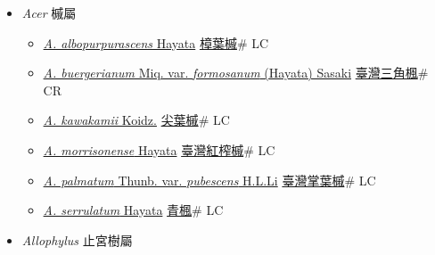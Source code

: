 
  \begin{itemize}
 \item[] \textit{Acer} 槭屬
                    
  \begin{itemize}
        \item[] \href{http://www.theplantlist.org/tpl1.1/search?q=Acer+albopurpurascens}{\textit{A. albopurpurascens} Hayata}   \href{\detokenize{http://taibnet.sinica.edu.tw/chi/taibnet_species_list.php?T2=樟葉槭&T2_new_value=true&fr=y}}{樟葉槭}\# LC
        \item[] \href{http://www.theplantlist.org/tpl1.1/search?q=Acer+buergerianum+var.+formosanum}{\textit{A. buergerianum} Miq. var. \textit{formosanum} (Hayata) Sasaki}   \href{\detokenize{http://taibnet.sinica.edu.tw/chi/taibnet_species_list.php?T2=臺灣三角楓&T2_new_value=true&fr=y}}{臺灣三角楓}\# CR
        \item[] \href{http://www.theplantlist.org/tpl1.1/search?q=Acer+kawakamii}{\textit{A. kawakamii} Koidz.}   \href{\detokenize{http://taibnet.sinica.edu.tw/chi/taibnet_species_list.php?T2=尖葉槭&T2_new_value=true&fr=y}}{尖葉槭}\# LC
        \item[] \href{http://www.theplantlist.org/tpl1.1/search?q=Acer+morrisonense}{\textit{A. morrisonense} Hayata}   \href{\detokenize{http://taibnet.sinica.edu.tw/chi/taibnet_species_list.php?T2=臺灣紅榨槭&T2_new_value=true&fr=y}}{臺灣紅榨槭}\# LC
        \item[] \href{http://www.theplantlist.org/tpl1.1/search?q=Acer+palmatum+var.+pubescens}{\textit{A. palmatum} Thunb. var. \textit{pubescens} H.L.Li}   \href{\detokenize{http://taibnet.sinica.edu.tw/chi/taibnet_species_list.php?T2=臺灣掌葉槭&T2_new_value=true&fr=y}}{臺灣掌葉槭}\# LC
        \item[] \href{http://www.theplantlist.org/tpl1.1/search?q=Acer+serrulatum}{\textit{A. serrulatum} Hayata}   \href{\detokenize{http://taibnet.sinica.edu.tw/chi/taibnet_species_list.php?T2=青楓&T2_new_value=true&fr=y}}{青楓}\# LC
  \end{itemize}
 \item[] \textit{Allophylus} 止宮樹屬
                    

\end{itemize}
